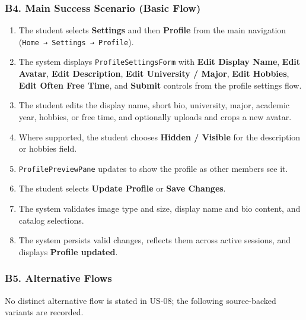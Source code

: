 \documentclass[12pt]{article}
\begin{document}
\hypertarget{sec:b4-main-success-scenario-basic-flow}{}
\subsubsection*{B4. Main Success Scenario (Basic Flow)}
\par\medskip

\begin{enumerate}
\item The student selects \textbf{Settings} and then \textbf{Profile} from the main navigation (\texttt{Home → Settings → Profile}).
\item The system displays \texttt{ProfileSettingsForm} with \textbf{Edit Display Name}, \textbf{Edit Avatar}, \textbf{Edit Description}, \textbf{Edit University / Major}, \textbf{Edit Hobbies}, \textbf{Edit Often Free Time}, and \textbf{Submit} controls from the profile settings flow.
\item The student edits the display name, short bio, university, major, academic year, hobbies, or free time, and optionally uploads and crops a new avatar.
\item Where supported, the student chooses \textbf{Hidden / Visible} for the description or hobbies field.
\item \texttt{ProfilePreviewPane} updates to show the profile as other members see it.
\item The student selects \textbf{Update Profile} or \textbf{Save Changes}.
\item The system validates image type and size, display name and bio content, and catalog selections.
\item The system persists valid changes, reflects them across active sessions, and displays \textbf{Profile updated}.
\end{enumerate}
\par\medskip

\hypertarget{sec:b5-alternative-flows}{}
\subsubsection*{B5. Alternative Flows}
\par\medskip

No distinct alternative flow is stated in US-08; the following source-backed variants are recorded.
\par\medskip
\end{document}
